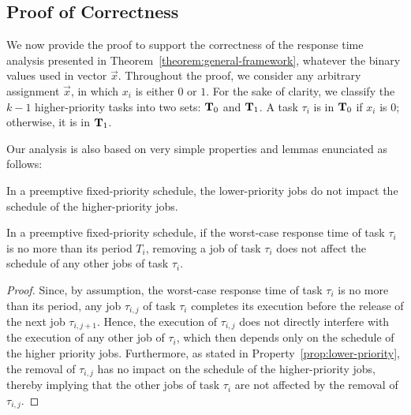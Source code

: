 \subsection{Proof of Correctness}  
\label{sec:proof-th1}

We now provide the proof to support the correctness of the response time analysis presented in
Theorem~\ref{theorem:general-framework}, whatever the binary values
used in vector $\vec{x}$.  %
Throughout the proof, we consider any arbitrary assignment
$\vec{x}$, in which $x_i$ is either $0$ or $1$. For the sake of clarity, we classify the $k-1$
higher-priority tasks into two sets: ${\bf T}_0$ and ${\bf T}_1$. A
task $\tau_i$ is in ${\bf T}_0$ if $x_i$ is $0$; otherwise, it is in
${\bf T}_1$.




Our analysis is also based on very simple properties and lemmas enunciated as follows:

\begin{Property}
\label{prop:lower-priority}
In a preemptive fixed-priority schedule, the lower-priority jobs do not impact the schedule of the higher-priority jobs.
\end{Property}


\begin{Lemma}
\label{lemma:remove-same-task}
In a preemptive fixed-priority schedule, if the worst-case response
time of task $\tau_i$ is no more than its period $T_i$, removing a job of task $\tau_i$ does not affect the schedule of any other jobs of task $\tau_i$.
\end{Lemma}
\begin{proof}
Since, by assumption, the worst-case response time of task $\tau_i$ is no more than its period, any job $\tau_{i,j}$ of task $\tau_i$ completes its execution before the release of the next job $\tau_{i,j+1}$. Hence, the execution of $\tau_{i,j}$ does not directly interfere with the execution of any other job of $\tau_i$, which then depends only on the schedule of the higher priority jobs. Furthermore, as stated in Property~\ref{prop:lower-priority}, the removal of $\tau_{i,j}$ has no impact on the schedule of the higher-priority jobs, thereby implying that the other jobs of task $\tau_i$ are not affected by the removal of $\tau_{i,j}$.
\end{proof}


